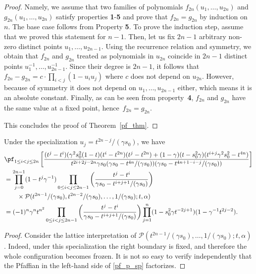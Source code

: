 \begin{proof}
	Namely, we assume that two families of polynomials $f_{2n}(u_1, \dots, u_{2n})$ and $g_{2n}(u_1, \dots, u_{2n})$ satisfy properties \textbf{1}-\textbf{5} and prove that $f_{2n} = g_{2n}$ by induction on $n$. The base case  follows from Property \textbf{5}. To prove the induction step, assume that we proved this statement for $n-1$. Then, let us fix $2n-1$ arbitrary non-zero distinct points $u_1, \dots, u_{2n-1}$. Using the recurrence relation and symmetry, we obtain that $f_{2n}$ and $g_{2n}$ treated as polynomials in $u_{2n}$ coincide in $2n-1$  distinct points $u_{1}^{-1}, \dots, u_{2n-1}^{-1}$. Since their degree is $2n-1$, it follows that $f_{2n} - g_{2n} = c \cdot \prod_{i<j}(1 - u_i u_j)$ where $c$ does not depend on $u_{2n}$. However, because of symmetry it does not depend on $u_1, \dots, u_{2n-1}$ either, which means it is an absolute constant. Finally, as can be seen from property~\textbf{4}, $f_{2n}$ and $g_{2n}$ have the same value at a fixed point, hence~$f_{2n} = g_{2n}$.
	
	This concludes the proof of Theorem~\ref{pf_thm}.
\end{proof}

\begin{coro}
	Under the specialization $u_j = t^{2n - j} / (\gamma s_{0})$, we have 
	\begin{equation} \label{pf_p_sp}
	\begin{split}
	&\pf_{1\leq i < j \leq 2n}
	\left[
	\frac{ (t^{j} - t^{i})(\gamma^2 s_0^2(1 - t)(t^{i} - t^{2n})(t^{j}- t^{2n}) + (1 - \gamma)(t-s_{0}^{2}\gamma)(t^{i+j}\gamma^2 s_0^2-t^{4n})}
	{t^{2i+2j-2n}\gamma s_0(\gamma s_0-t^{4n}/(\gamma s_0)) (\gamma s_0 -t^{4n+1-i-j}/(\gamma s_0))}
	\right]
	\\
	&=\prod_{j = 0}^{2n-1} (1 - t^j\gamma^{-1}) \prod_{0 \leq i<j \leq 2n-1}
	\left(
	\frac{t^j - t^i}{\gamma s_0 -t^{i+j+1} / (\gamma s_0)}
	\right)\\
	&\qquad\times
	\mathcal{P}(t^{2n - 1} / (\gamma s_{0}), t^{2n - 2} / (\gamma s_{0}), \dots, 1 / (\gamma s_{0}); t, \alpha)  \\
	&=(-1)^{n} \gamma^{n} t^{n^{2}} \prod_{0 \leq i<j \leq 2n-1}
	\left(
	\frac{t^j - t^i}{\gamma s_0 -t^{i+j+1} / (\gamma s_0)}
	\right)
	\prod_{j=1}^{n}(1 - s_{0}^{2}\gamma t^{-2j+1})(1 - \gamma^{-1} t^{2j-2})
	.
	\end{split}
	\end{equation}
\end{coro}
\begin{proof}
	Consider the lattice interpretation of $\mathcal{P}(t^{2n - 1} / (\gamma s_{0}), \dots, 1 / (\gamma s_{0}); t, \alpha)$. Indeed, under this specialization the right boundary is fixed, and therefore the whole configuration becomes frozen.
	It is not so easy to verify independently that the Pfaffian in the left-hand side of \eqref{pf_p_sp} factorizes.
\end{proof}

